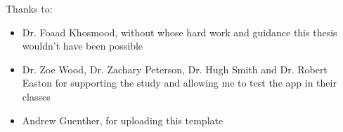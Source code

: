 \noindent
Thanks to:
\begin{itemize}
	\item Dr. Foaad Khosmood, without whose hard work and guidance this thesis wouldn't have been possible
	\item Dr. Zoe Wood, Dr. Zachary Peterson, Dr. Hugh Smith and Dr. Robert Easton for supporting the study and allowing me to test the app in their classes
    \item Andrew Guenther, for uploading this template
\end{itemize}
